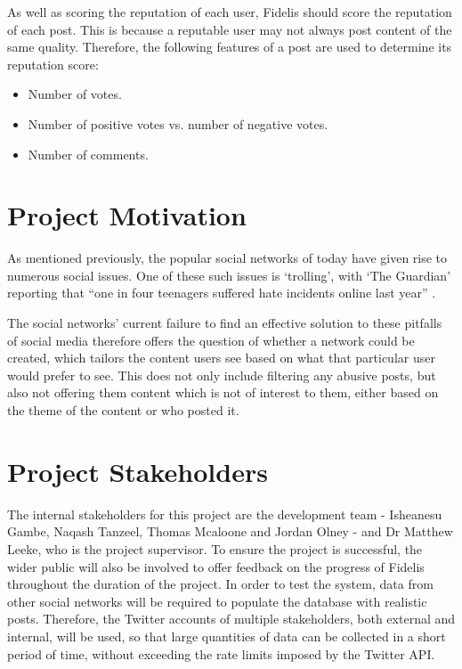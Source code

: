 As well as scoring the reputation of each user, Fidelis should score the reputation of each post. This is because a reputable user may not always post content of the same quality. Therefore, the following features of a post are used to determine its reputation score:

\begin{itemize}
\item Number of votes.
\item Number of positive votes vs. number of negative votes.
\item Number of comments.
\end{itemize}

\section{Project Motivation}
As mentioned previously, the popular social networks of today have given rise to numerous social issues. One of these such issues is `trolling', with `The Guardian' reporting that ``one in four teenagers suffered hate incidents online last year'' \cite{Gani:Trolling}. 

The social networks' current failure to find an effective solution to these pitfalls of social media therefore offers the question of whether a network could be created, which tailors the content users see based on what that particular user would prefer to see. This does not only include filtering any abusive posts, but also not offering them content which is not of interest to them, either based on the theme of the content or who posted it.

\section{Project Stakeholders}
The internal stakeholders for this project are the development team - Isheanesu Gambe, Naqash Tanzeel, Thomas Mcaloone and Jordan Olney - and Dr Matthew Leeke, who is the project supervisor. To ensure the project is successful, the wider public will also be involved to offer feedback on the progress of Fidelis throughout the duration of the project. In order to test the system, data from other social networks will be required to populate the database with realistic posts. Therefore, the Twitter accounts of multiple stakeholders, both external and internal, will be used, so that large quantities of data can be collected in a short period of time, without exceeding the rate limits imposed by the Twitter API.

